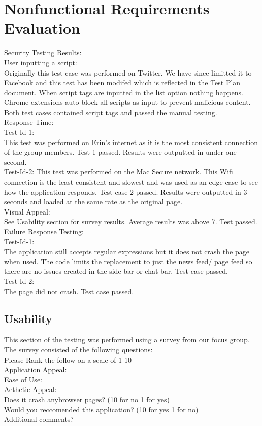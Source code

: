 \documentclass[12pt, titlepage]{article}
\begin{document}
\section{Nonfunctional Requirements Evaluation}
Security Testing Results:
\\
User inputting a script:
\\
Originally this test case was performed on Twitter. We have since limitted it to Facebook and this test has been modifed which is reflected in the Test Plan document. When script tags are inputted in the list option nothing happens. Chrome extensions auto block all scripts as input to prevent malicious content. Both test cases contained script tags and passed the manual testing.
\\
Response Time:
\\
Test-Id-1: \\
This test was performed on Erin's internet as it is the most consistent connection of the group members. Test 1 passed. Results were outputted in under one second. \\
Test-Id-2: This test was performed on the Mac Secure network. This Wifi connection is the least consistent and slowest and was used as an edge case to see how the application responds. Test case 2 passed. Results were outputted in 3 seconds and loaded at the same rate as the original page.\\
Visual Appeal: \\
See Usability section for survey results. Average results was above 7. Test passed. \\
Failure Response Testing: \\
Test-Id-1: \\
The application still accepts regular expressions but it does not crash the page when used. The code limits the replacement to just the news feed/ page feed so there are no issues created in the side bar or chat bar. Test case passed. \\
Test-Id-2:\\
The page did not crash. Test case passed.

\subsection{Usability}
This section of the testing was performed using a survey from our focus group. The survey consisted of the following questions: \\
Please Rank the follow on a scale of 1-10 \\
Application Appeal:  \\
Ease of Use:\\
Aethetic Appeal: \\
Does it crash anybrowser pages? (10 for no 1 for yes) \\
Would you reccomended this application? (10 for yes 1 for no) \\
Additional comments? \\
\end{document}
